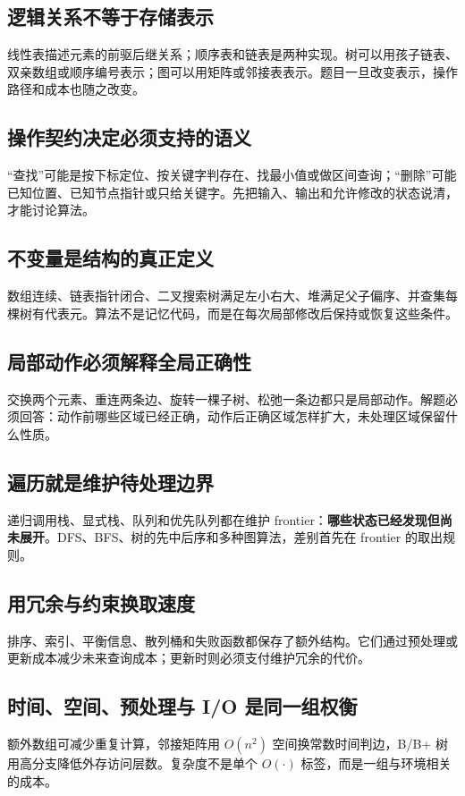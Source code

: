 \documentclass[11pt,a4paper,openany]{ctexbook}
\newcommand{\key}[1]{\textbf{\color{deep}#1}}
\begin{document}
\subsection{逻辑关系不等于存储表示}
线性表描述元素的前驱后继关系；顺序表和链表是两种实现。树可以用孩子链表、双亲数组或顺序编号表示；图可以用矩阵或邻接表表示。题目一旦改变表示，操作路径和成本也随之改变。

\subsection{操作契约决定必须支持的语义}
“查找”可能是按下标定位、按关键字判存在、找最小值或做区间查询；“删除”可能已知位置、已知节点指针或只给关键字。先把输入、输出和允许修改的状态说清，才能讨论算法。

\subsection{不变量是结构的真正定义}
数组连续、链表指针闭合、二叉搜索树满足左小右大、堆满足父子偏序、并查集每棵树有代表元。算法不是记忆代码，而是在每次局部修改后保持或恢复这些条件。

\subsection{局部动作必须解释全局正确性}
交换两个元素、重连两条边、旋转一棵子树、松弛一条边都只是局部动作。解题必须回答：动作前哪些区域已经正确，动作后正确区域怎样扩大，未处理区域保留什么性质。

\subsection{遍历就是维护待处理边界}
递归调用栈、显式栈、队列和优先队列都在维护 frontier：\key{哪些状态已经发现但尚未展开}。DFS、BFS、树的先中后序和多种图算法，差别首先在 frontier 的取出规则。

\subsection{用冗余与约束换取速度}
排序、索引、平衡信息、散列桶和失败函数都保存了额外结构。它们通过预处理或更新成本减少未来查询成本；更新时则必须支付维护冗余的代价。

\subsection{时间、空间、预处理与 I/O 是同一组权衡}
额外数组可减少重复计算，邻接矩阵用 $O(n^2)$ 空间换常数时间判边，B/B+ 树用高分支降低外存访问层数。复杂度不是单个 $O(\cdot)$ 标签，而是一组与环境相关的成本。
\end{document}
